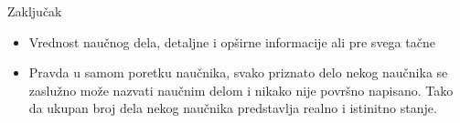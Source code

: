 \documentclass[11pt]{beamer}
\begin{document}
\begin{frame}{Zaključak}
    \begin{itemize}
      \item Vrednost naučnog dela, detaljne i opširne informacije ali pre svega tačne
      \item Pravda u samom poretku naučnika, svako priznato delo nekog naučnika se zaslužno može nazvati naučnim delom i nikako nije površno napisano. Tako da ukupan broj dela nekog naučnika predstavlja realno i istinitno stanje.
    
    \end{itemize}
       
\end{frame}
\end{document}
